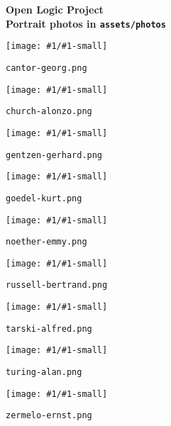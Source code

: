 \documentclass[12pt]{article}
\def\displayphoto#1{
\begin{minipage}{.5\textwidth}
  \texttt{[image: \#1/\#1-small]}
\end{minipage}
\begin{minipage}{.5\textwidth}
  \texttt{#1.png}\quad
\end{minipage}\bigskip\par}
\begin{document}
\begin{center}
\large\textbf{Open Logic Project\\
  Portrait photos in \texttt{assets/photos}}
\end{center}

\displayphoto{cantor-georg}

\displayphoto{church-alonzo}

\displayphoto{gentzen-gerhard}

\displayphoto{goedel-kurt}

\displayphoto{noether-emmy}

\displayphoto{russell-bertrand}

\displayphoto{tarski-alfred}

\displayphoto{turing-alan}

\displayphoto{zermelo-ernst}
\end{document}
